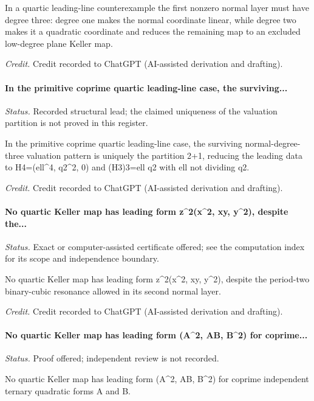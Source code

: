 In a quartic leading-line counterexample the first nonzero normal layer must have degree three: degree one makes the normal coordinate linear, while degree two makes it a quadratic coordinate and reduces the remaining map to an excluded low-degree plane Keller map.

\emph{Credit.} Credit recorded to ChatGPT (AI-assisted derivation and drafting).

\label{supp-note-02-017}
\paragraph{In the primitive coprime quartic leading-line case, the surviving...}
\emph{Status.} Recorded structural lead; the claimed uniqueness of the
valuation partition is not proved in this register.

In the primitive coprime quartic leading-line case, the surviving normal-degree-three valuation pattern is uniquely the partition 2+1, reducing the leading data to H4=(ell\textasciicircum{}4, q2\textasciicircum{}2, 0) and (H3)3=ell q2 with ell not dividing q2.

\emph{Credit.} Credit recorded to ChatGPT (AI-assisted derivation and drafting).

\label{supp-note-02-018}
\paragraph{No quartic Keller map has leading form z\textasciicircum{}2(x\textasciicircum{}2, xy, y\textasciicircum{}2), despite the...}
\emph{Status.} Exact or computer-assisted certificate offered; see the computation index for its scope and independence boundary.

No quartic Keller map has leading form z\textasciicircum{}2(x\textasciicircum{}2, xy, y\textasciicircum{}2), despite the period-two binary-cubic resonance allowed in its second normal layer.

\emph{Credit.} Credit recorded to ChatGPT (AI-assisted derivation and drafting).

\label{supp-note-02-019}
\paragraph{No quartic Keller map has leading form (A\textasciicircum{}2, AB, B\textasciicircum{}2) for coprime...}
\emph{Status.} Proof offered; independent review is not recorded.

No quartic Keller map has leading form (A\textasciicircum{}2, AB, B\textasciicircum{}2) for coprime independent ternary quadratic forms A and B.

